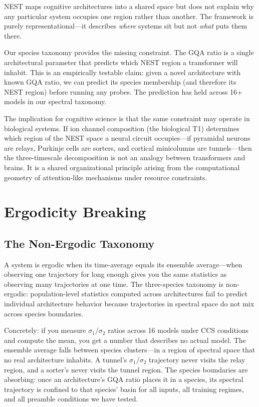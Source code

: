\documentclass[12pt]{article}
\begin{document}
NEST maps cognitive architectures into a shared space but does not explain why any particular system occupies one region rather than another. The framework is purely representational---it describes \emph{where} systems sit but not \emph{what} puts them there.

Our species taxonomy provides the missing constraint. The GQA ratio is a single architectural parameter that predicts which NEST region a transformer will inhabit. This is an empirically testable claim: given a novel architecture with known GQA ratio, we can predict its species membership (and therefore its NEST region) before running any probes. The prediction has held across 16+ models in our spectral taxonomy.

The implication for cognitive science is that the same constraint may operate in biological systems. If ion channel composition (the biological T1) determines which region of the NEST space a neural circuit occupies---if pyramidal neurons are relays, Purkinje cells are sorters, and cortical minicolumns are tunnels---then the three-timescale decomposition is not an analogy between transformers and brains. It is a shared organizational principle arising from the computational geometry of attention-like mechanisms under resource constraints.

\section{Ergodicity Breaking}

\subsection{The Non-Ergodic Taxonomy}

A system is ergodic when its time-average equals its ensemble average---when observing one trajectory for long enough gives you the same statistics as observing many trajectories at one time. The three-species taxonomy is non-ergodic: population-level statistics computed across architectures fail to predict individual architecture behavior because trajectories in spectral space do not mix across species boundaries.

Concretely: if you measure $\sigma_1/\sigma_2$ ratios across 16 models under CCS conditions and compute the mean, you get a number that describes no actual model. The ensemble average falls between species clusters---in a region of spectral space that no real architecture inhabits. A tunnel's $\sigma_1/\sigma_2$ trajectory never visits the relay region, and a sorter's never visits the tunnel region. The species boundaries are absorbing: once an architecture's GQA ratio places it in a species, its spectral trajectory is confined to that species' basin for all inputs, all training regimes, and all preamble conditions we have tested.
\end{document}
